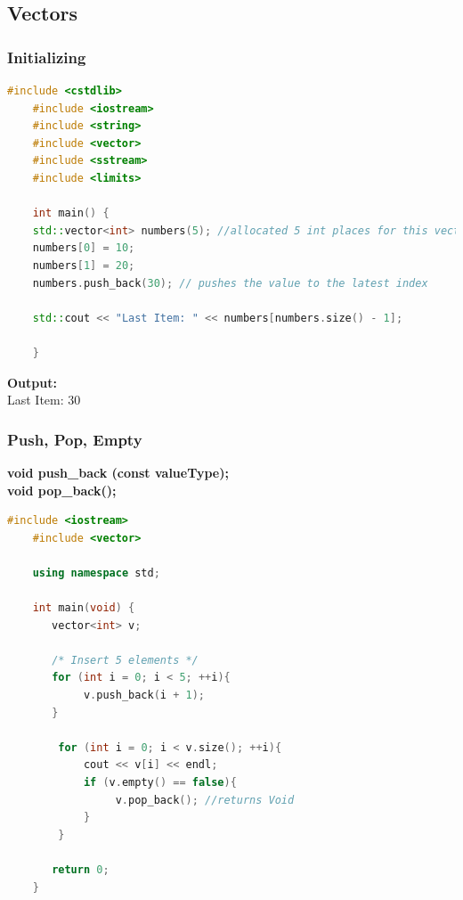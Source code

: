 \documentclass[12pt , a4paper]{article}
\newcommand{\hl}[1]{\colorbox{coolblack}{\color{cream}\textbf{#1}\color{black}}}
\begin{document}

	\subsection{Vectors}


	\subsubsection{Initializing}
	\begin{lstlisting}[language=C++]
	#include <cstdlib>
	#include <iostream>
	#include <string>
	#include <vector>
	#include <sstream>
	#include <limits>
	
	int main() {
	std::vector<int> numbers(5); //allocated 5 int places for this vector
	numbers[0] = 10;
	numbers[1] = 20;
	numbers.push_back(30); // pushes the value to the latest index
	
	std::cout << "Last Item: " << numbers[numbers.size() - 1];
	
	}
	\end{lstlisting}

	\begin{tcolorbox}
	\textbf{Output:}\\
	Last Item: 30
	\end{tcolorbox}


	\subsubsection{Push, Pop, Empty}
	\hl{void push\_back (const valueType);}\\
	\hl{void pop\_back();}
	\begin{lstlisting}[language=C++]
	#include <iostream>
	#include <vector>
	
	using namespace std;
	
	int main(void) {
	   vector<int> v;
	
	   /* Insert 5 elements */
	   for (int i = 0; i < 5; ++i){
	        v.push_back(i + 1);
	   }
	
	    for (int i = 0; i < v.size(); ++i){
	        cout << v[i] << endl;
	        if (v.empty() == false){
	             v.pop_back(); //returns Void
	        }
	    }
	
	   return 0;
	}
	\end{lstlisting}
\end{document}
